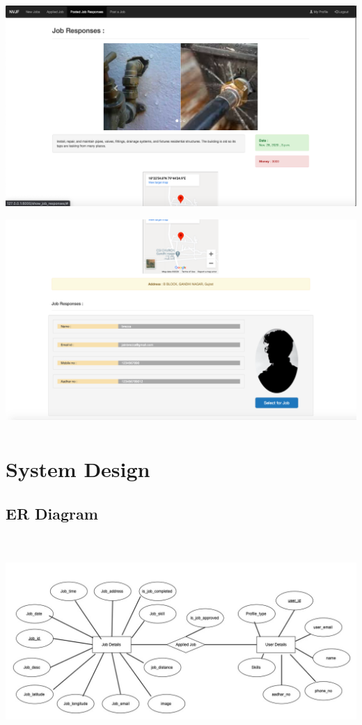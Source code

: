 \documentclass[a4paper 12pt]{article}
\begin{document}
\includegraphics[width=15cm, height=8cm]{Job responses.png}
\includegraphics[width=15cm, height=8cm]{job responses 2.png}

\section{\textbf{System Design}}
\subsection{ER Diagram}

\includegraphics[width=15cm, height=8cm]{er_diagram.jpg}
\end{document}
